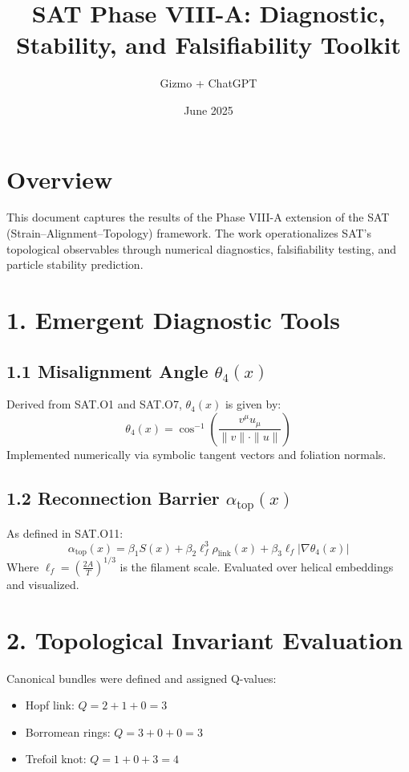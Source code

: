 \documentclass{article}
\title{SAT Phase VIII-A: Diagnostic, Stability, and Falsifiability Toolkit}
\author{Gizmo + ChatGPT}
\date{June 2025}
\begin{document}
\maketitle

\section*{Overview}
This document captures the results of the Phase VIII-A extension of the SAT (Strain–Alignment–Topology) framework. The work operationalizes SAT's topological observables through numerical diagnostics, falsifiability testing, and particle stability prediction.

\section*{1. Emergent Diagnostic Tools}

\subsection*{1.1 Misalignment Angle \texorpdfstring{$\theta_4(x)$}{theta4(x)}}
Derived from SAT.O1 and SAT.O7, $\theta_4(x)$ is given by:
\[
\theta_4(x) = \cos^{-1} \left( \frac{v^\mu u_\mu}{\|v\| \cdot \|u\|} \right)
\]
Implemented numerically via symbolic tangent vectors and foliation normals.

\subsection*{1.2 Reconnection Barrier \texorpdfstring{$\alpha_{\mathrm{top}}(x)$}{alpha_top(x)}}
As defined in SAT.O11:
\[
\alpha_{\mathrm{top}}(x) = \beta_1 S(x) + \beta_2 \ell_f^3 \rho_{\mathrm{link}}(x) + \beta_3 \ell_f |\nabla \theta_4(x)|
\]
Where $\ell_f = \left( \frac{2A}{T} \right)^{1/3}$ is the filament scale. Evaluated over helical embeddings and visualized.

\section*{2. Topological Invariant Evaluation}

Canonical bundles were defined and assigned Q-values:
\begin{itemize}
    \item Hopf link: $Q = 2 + 1 + 0 = 3$
    \item Borromean rings: $Q = 3 + 0 + 0 = 3$
    \item Trefoil knot: $Q = 1 + 0 + 3 = 4$
\end{itemize}
\end{document}
